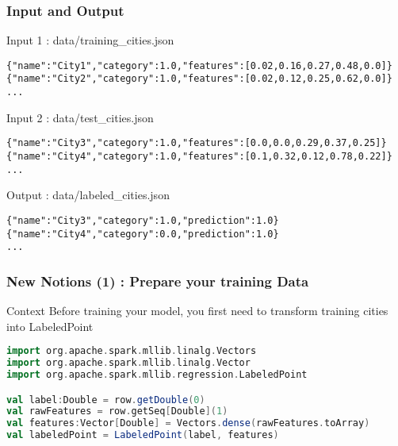 \documentclass[slidetop,9pt,utf8]{beamer}
\begin{document}
\begin{CJK}{UTF8}{gbsn}
\begin{frame}
\end{frame}

\begin{frame}[fragile]

  \frametitle{Input and Output}
  
  \begin{block}{Input 1 : data/training\_cities.json}
    \begin{verbatim}
{"name":"City1","category":1.0,"features":[0.02,0.16,0.27,0.48,0.0]}
{"name":"City2","category":1.0,"features":[0.02,0.12,0.25,0.62,0.0]}
...
    \end{verbatim}
  \end{block}

  \begin{block}{Input 2 : data/test\_cities.json}
    \begin{verbatim}
{"name":"City3","category":1.0,"features":[0.0,0.0,0.29,0.37,0.25]}
{"name":"City4","category":1.0,"features":[0.1,0.32,0.12,0.78,0.22]}
...
    \end{verbatim}
  \end{block}

  \begin{block}{Output : data/labeled\_cities.json}
    \begin{verbatim}
{"name":"City3","category":1.0,"prediction":1.0}
{"name":"City4","category":0.0,"prediction":1.0}
...
    \end{verbatim}
  \end{block}

\end{frame}

\begin{frame}[fragile]
  \frametitle{New Notions (1) : Prepare your training Data}

  \begin{block}{Context}
    Before training your model, you first need to transform training cities into LabeledPoint
  \end{block}

  \begin{lstlisting}[label=TransformDataToLinearRegression, caption=Transform row into LabeledPoint, language=scala, style=code]
import org.apache.spark.mllib.linalg.Vectors
import org.apache.spark.mllib.linalg.Vector
import org.apache.spark.mllib.regression.LabeledPoint

val label:Double = row.getDouble(0)
val rawFeatures = row.getSeq[Double](1)
val features:Vector[Double] = Vectors.dense(rawFeatures.toArray)
val labeledPoint = LabeledPoint(label, features)
  \end{lstlisting}


\end{frame}
\end{CJK}
\end{document}
